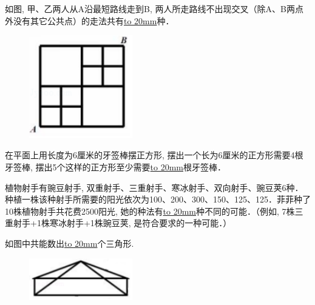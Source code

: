 \item {
    如图, 甲、乙两人从A沿最短路线走到B, 两人所走路线不出现交叉（除A、B两点外没有其它公共点）的走法共有\underline{\hbox to 20mm{}}种．
    \begin{figure}[H] 
        \centering
        \includegraphics[width=0.4\textwidth]{./pics/Chapter_6/2016_4.png}
    \end{figure}
}

\item {
    在平面上用长度为6厘米的牙签棒摆正方形, 摆出一个长为6厘米的正方形需要4根牙签棒, 摆出5个这样的正方形至少需要\underline{\hbox to 20mm{}}根牙签棒．
}

\item {
    植物射手有豌豆射手, 双重射手、三重射手、寒冰射手、双向射手、豌豆荚6种．种植一株该种射手所需要的阳光依次为100、200、300、150、125、125．菲菲种了10株植物射手共花费2500阳光, 她的种法有\underline{\hbox to 20mm{}}种不同的可能．（例如, 7株三重射手+1株寒冰射手+1株豌豆荚, 是符合要求的一种可能．）
}

\item {
    如图中共能数出\underline{\hbox to 20mm{}}个三角形.
    \begin{figure}[H] 
        \centering
        \includegraphics[width=0.4\textwidth]{./pics/Chapter_6/2015_1.png}
    \end{figure}
}


